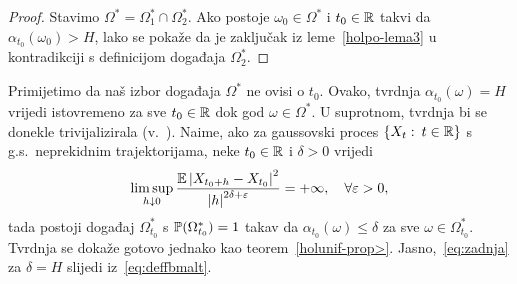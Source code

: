 \documentclass[main.tex]{subfiles}
\begin{document}
\begin{proof}
	Stavimo \( \Omega^* = \Omega_1^* \cap \Omega_2^* \). Ako postoje \( \omega_0 \in \Omega^* \)
	i \( t_0 \in \R \) takvi da \( \alpha_{t_0}(\omega_0) > H \), lako se pokaže
	da je zaključak iz leme~\ref{holpo-lema3} u kontradikciji
	s definicijom događaja \( \Omega_2^* \).
\end{proof}

\begin{komentar}
	Primijetimo da naš izbor događaja \( \Omega^* \)
	ne ovisi o \( t_0 \). Ovako, tvrdnja \( \alpha_{t_0}(\omega) = H \) vrijedi
	istovremeno za sve \( t_0 \in \R \) dok god \( \omega \in \Omega^* \).
	U suprotnom, tvrdnja bi se donekle trivijalizirala (v.~\cite[str.~18.]{ayache}).
	Naime, ako za gaussovski proces \( \left\{ X_t \st t \in \R  \right\} \)
	s g.s.\ neprekidnim trajektorijama, neke \( t_0 \in \R \) i \( \delta> 0 \) vrijedi
	\begin{equation}\label{eq:zadnja}
		\limsup\limits_{h \downarrow 0} \frac{\E \abs{X_{t_0+h}-X_{t_0}}^2}{\abs h^{2\delta+\varepsilon}} = +\infty,
		\quad \forall \varepsilon > 0,
	\end{equation}
	tada postoji događaj \( \Omega_{t_0}^* \) s \( \P(\Omega_{t_0}^*) = 1 \)
	takav da \( \alpha_{t_0}(\omega) \le \delta \) za sve \( \omega \in \Omega_{t_0}^* \).
	Tvrdnja se dokaže gotovo jednako kao teorem~\ref{holunif-prop>}.
	Jasno,~\eqref{eq:zadnja} za \( \delta=H \) slijedi iz~\eqref{eq:deffbmalt}.

\end{komentar}
\end{document}
